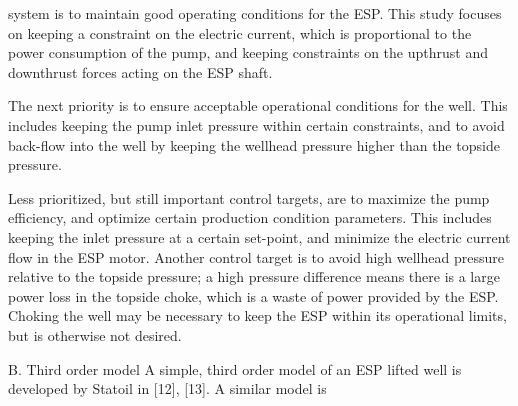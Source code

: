 system is to maintain good operating conditions for the ESP. This study focuses on keeping a constraint on the electric current, which is proportional to the power consumption
of the pump, and keeping constraints on the upthrust and downthrust forces acting on the ESP shaft.

The next priority is to ensure acceptable operational conditions for the well. This includes keeping the pump inlet pressure within certain constraints, and to avoid back-flow into the well by keeping the wellhead pressure higher than
the topside pressure.

Less prioritized, but still important control targets, are to
maximize the pump efficiency, and optimize certain production condition parameters. This includes keeping the inlet pressure at a certain set-point, and minimize the electric
current flow in the ESP motor. Another control target is to avoid high wellhead pressure relative to the topside pressure; a high pressure difference means there is a large power loss in the topside choke, which is a waste of power provided by the ESP. Choking the well may be necessary to keep the ESP within its operational limits, but is otherwise not desired.

B. Third order model A simple, third order model of an ESP lifted well is
developed by Statoil in [12], [13]. A similar model is



